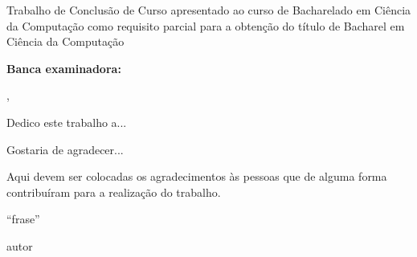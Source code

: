 % 
\begin{folhadeaprovacao}

	\begin{center}
		{\ABNTEXchapterfont\bfseries\imprimirautor}
		\vspace{6em}

			\ABNTEXchapterfont\bfseries\imprimirtitulo
		
	\end{center}
		\vspace{1em}
		{\justify
		Trabalho de Conclusão de Curso apresentado ao curso de Bacharelado em Ciência da Computação como requisito parcial para a obtenção do título de Bacharel em Ciência da Computação}
	
	\vspace{3em} 
	\noindent
	{\bfseries Banca examinadora:}

    \vspace*{\fill}
    \begin{center}
    	\imprimirlocal,\,\imprimirfulldata
    \end{center}
\end{folhadeaprovacao}


\begin{dedicatoria}				
Dedico este trabalho a...  
\end{dedicatoria}


\begin{agradecimentos}
Gostaria de agradecer...

Aqui devem ser colocadas os agradecimentos às pessoas que de alguma forma contribuíram para a realização do trabalho.
\end{agradecimentos}


\begin{epigrafe}	
``frase''
\\
\par
autor
\end{epigrafe}


